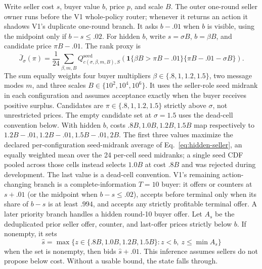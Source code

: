 Write seller cost $s$, buyer value $b$, price $p$, and scale $B$. The outer
one-round seller owner runs before the V1 whole-policy router; whenever it
returns an action it shadows V1's duplicate one-round branch. It asks $b-.01$ when $b$ is visible,
using the midpoint only if $b-s\leq.02$.
For hidden $b$, write $s=\sigma B$, $b=\beta B$, and candidate price $\pi B-.01$.
The rank proxy is
\begin{equation}
\bar J_\sigma(\pi)=\frac1{24}\sum_{\beta,m,B}
Q^{\mathrm{seed}}_{c(\sigma,\beta,m,B),S}
\!\left(\mathbf1\{\beta B>\pi B-.01\}
\{\pi B-.01-\sigma B\}\right).
\label{eq:hidden-seller}
\end{equation}
The sum equally weights four buyer multipliers $\beta\in\{.8,1,1.2,1.5\}$,
two message modes $m$, and three scales $B\in\{10^2,10^4,10^6\}$.
It uses the seller-role seed midrank in each configuration and assumes
acceptance exactly when the buyer receives positive surplus. Candidates are
$\pi\in\{.8,1,1.2,1.5\}$ strictly above $\sigma$, not unrestricted prices.
The empty candidate set at $\sigma=1.5$ uses the dead-cell convention below.
With hidden $b$, costs
$.8B,1.0B,1.2B,1.5B$ map respectively to
$1.2B-.01,1.2B-.01,1.5B-.01,2B$. The first three values maximize the declared
per-configuration seed-midrank average of Eq.~\eqref{eq:hidden-seller}, an
equally weighted mean over the 24 per-cell seed midranks; a single seed CDF
pooled across those cells instead selects $1.0B$ at cost $.8B$ and was
rejected during development. The last value is a dead-cell convention. V1's remaining action-changing branch is a
complete-information $T=10$ buyer: it offers or counters at $s+.01$ (or the
midpoint when $b-s\leq.02$), accepts before terminal only when its share of
$b-s$ is at least $.994$, and accepts any strictly profitable terminal offer.
A later priority branch handles a hidden round-10 buyer offer. Let $A_s$ be the
deduplicated prior seller offer, counter, and last-offer prices strictly below
$b$. If nonempty, it sets
\begin{equation}
\hat s=\max\{z\in\{.8B,1.0B,1.2B,1.5B\}:z<b,\ z\leq\min A_s\}
\label{eq:banked-hidden-bound}
\end{equation}
when the set is nonempty, then bids $\hat s+.01$. This inference assumes sellers
do not propose below cost. Without a usable bound, the state falls through.

